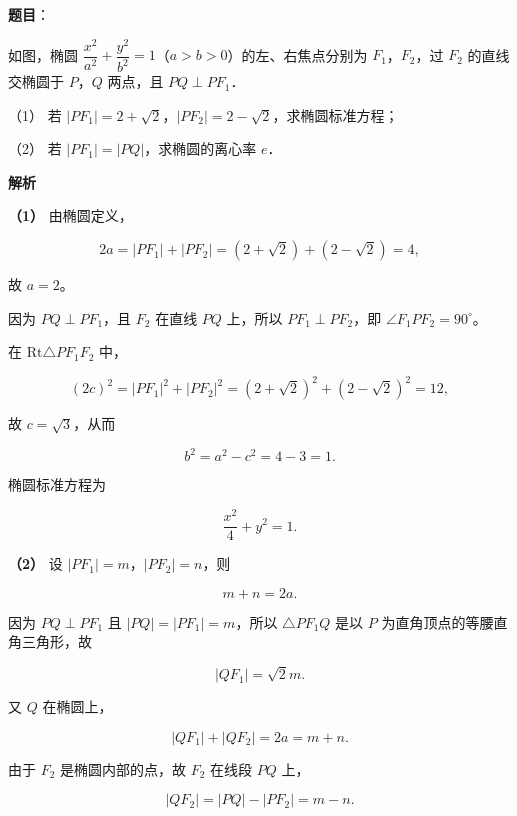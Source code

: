 \begin{answer}

\textbf{题目}：

如图，椭圆 $\dfrac{x^{2}}{a^{2}}+\dfrac{y^{2}}{b^{2}}=1$（$a>b>0$）的左、右焦点分别为 $F_{1}$，$F_{2}$，过 $F_{2}$ 的直线交椭圆于 $P$，$Q$ 两点，且 $PQ\perp PF_{1}$．

（1） 若 $|PF_{1}|=2+\sqrt{2}$，$|PF_{2}|=2-\sqrt{2}$，求椭圆标准方程；

（2） 若 $|PF_{1}|=|PQ|$，求椭圆的离心率 $e$．
\nopagebreak[4]
\begin{center}\end{center}
\nopagebreak[4]
\textbf{解析}

\textbf{（1）} 由椭圆定义，

\nopagebreak[4]
\[
2a=|PF_{1}|+|PF_{2}|=(2+\sqrt{2})+(2-\sqrt{2})=4,
\]

故 $a=2$。

因为 $PQ\perp PF_{1}$，且 $F_{2}$ 在直线 $PQ$ 上，所以 $PF_{1}\perp PF_{2}$，即 $\angle F_{1}PF_{2}=90^\circ$。

在 $\mathrm{Rt}\triangle PF_{1}F_{2}$ 中，

\nopagebreak[4]
\[
(2c)^{2}=|PF_{1}|^{2}+|PF_{2}|^{2}
=(2+\sqrt{2})^{2}+(2-\sqrt{2})^{2}=12,
\]

故 $c=\sqrt{3}$，从而

\nopagebreak[4]
\[
b^{2}=a^{2}-c^{2}=4-3=1.
\]

椭圆标准方程为

\nopagebreak[4]
\[
\frac{x^{2}}{4}+y^{2}=1.
\]

\textbf{（2）} 设 $|PF_{1}|=m$，$|PF_{2}|=n$，则

\nopagebreak[4]
\[
m+n=2a.
\]

因为 $PQ\perp PF_{1}$ 且 $|PQ|=|PF_{1}|=m$，所以 $\triangle PF_{1}Q$ 是以 $P$ 为直角顶点的等腰直角三角形，故

\nopagebreak[4]
\[
|QF_{1}|=\sqrt{2}m.
\]

又 $Q$ 在椭圆上，

\nopagebreak[4]
\[
|QF_{1}|+|QF_{2}|=2a=m+n.
\]

由于 $F_{2}$ 是椭圆内部的点，故 $F_{2}$ 在线段 $PQ$ 上，

\nopagebreak[4]
\[
|QF_{2}|=|PQ|-|PF_{2}|=m-n.
\]


\end{answer}
